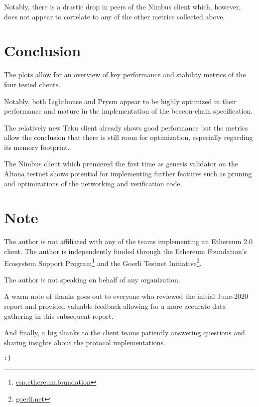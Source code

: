 \documentclass[twoside,twocolumn]{article}
\begin{document}
Notably, there is a drastic drop in peers of the Nimbus client which, however, does not appear to correlate to any of the other metrics collected above.\par

\section{Conclusion}
The plots allow for an overview of key performance and stability metrics of the four tested clients.\par

Notably, both Lighthouse and Prysm appear to be highly optimized in their performance and mature in the implementation of the beacon-chain specification.\par

The relatively new Teku client already shows good performance but the metrics allow the conclusion that there is still room for optimization, especially regarding its memory footprint.\par

The Nimbus client which premiered the first time as genesis validator on the Altona testnet shows potential for implementing further features such as pruning and optimizations of the networking and verification code.\par

\vspace{\fill}

\section*{Note}
The author is not affiliated with any of the teams implementing an Ethereum 2.0 client. The author is independently funded through the Ethereum Foundation's Ecosystem Support Program\footnote{\href{https://esp.ethereum.foundation}{esp.ethereum.foundation}} and the Goerli Testnet Initiative\footnote{\href{https://goerli.net}{goerli.net}}.\par

The author is not speaking on behalf of any organization.\par

A warm note of thanks goes out to everyone who reviewed the initial June-2020 report and provided valuable feedback allowing for a more accurate data gathering in this subsequent report.\par

And finally, a big thanks to the client teams patiently answering questions and sharing insights about the protocol implementations.

\texttt{:)}
\end{document}
